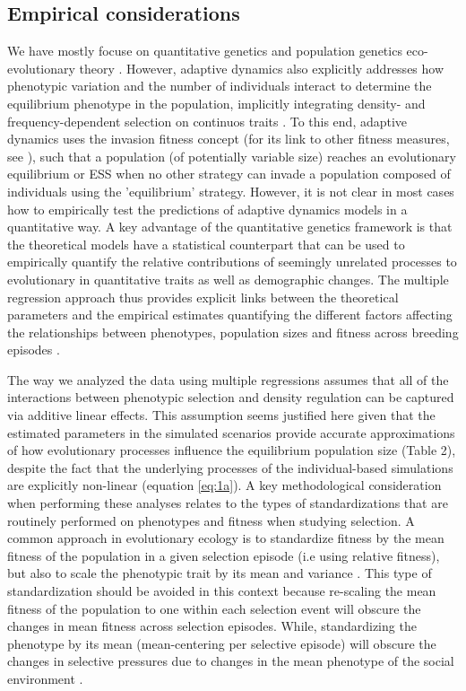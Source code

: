 \documentclass{article}
\begin{document}
\subsection{Empirical considerations}
We have mostly focuse on quantitative genetics and population genetics  eco-evolutionary theory \citep{Engen2013, Engen2020, Lande2017, Lande2009a}. However, adaptive dynamics also explicitly addresses how phenotypic variation and the number of individuals interact to determine the equilibrium phenotype in the population, implicitly integrating density- and frequency-dependent selection on continuos traits \citep{McGill2007}. To this end, adaptive dynamics uses the invasion fitness concept (for its link to other fitness measures, see \cite{Lehmann2016}), such that a population (of potentially variable size) reaches an evolutionary equilibrium or ESS when no other strategy can invade a population composed of individuals using the 'equilibrium' strategy. However, it is not clear in most cases how to empirically test the predictions of adaptive dynamics models in a quantitative way. A key advantage of the quantitative genetics framework is that the theoretical models have a statistical counterpart that can be used to empirically quantify the relative contributions of seemingly unrelated processes to evolutionary in quantitative traits as well as demographic changes. The multiple regression approach thus provides explicit links between the theoretical parameters and the empirical estimates quantifying the different factors affecting the relationships between phenotypes, population sizes and fitness across breeding episodes \citep{Lande1983, Queller1992b, Wolf1999SocialSelection, Heisler1987, Goodnight1992}. 

 The way we analyzed the data using multiple regressions assumes that all of the interactions between phenotypic selection and density regulation can be captured via additive linear effects. This assumption seems justified here given that the estimated parameters in the simulated scenarios provide accurate approximations of how evolutionary processes influence the equilibrium population size (Table 2), despite the fact that the underlying processes of the individual-based simulations are explicitly non-linear (equation \ref{eq:1a}). A key methodological consideration when performing these analyses relates to the types of standardizations that are routinely performed on phenotypes and fitness when studying selection. A common approach in evolutionary ecology is to standardize fitness by the mean fitness of the population in a given selection episode (i.e using relative fitness), but also to scale the phenotypic trait by its mean and variance \citep{Dingemanse2021}. This type of standardization should be avoided in this context because re-scaling the mean fitness of the population to one within each selection event will obscure the changes in mean fitness across selection episodes. While, standardizing the phenotype by its mean (mean-centering per selective episode) will obscure the changes in selective pressures due to changes in the mean phenotype of the social environment \citep{Araya-Ajoy2020}.
\end{document}
